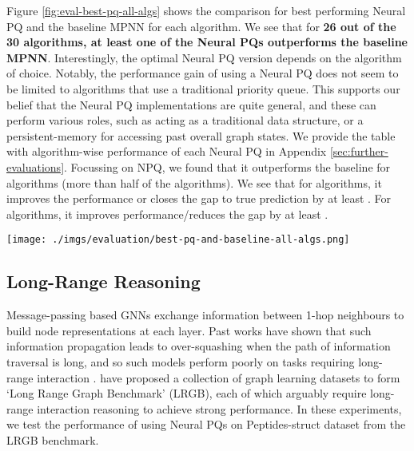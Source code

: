 \documentclass{article}
\theoremstyle{plain}
\theoremstyle{definition}
\theoremstyle{remark}
\begin{document}
Figure \ref{fig:eval-best-pq-all-algs} shows the comparison for best performing Neural PQ and the baseline MPNN for each algorithm.
We see that for \textbf{26 out of the 30 algorithms, at least one of the Neural PQs outperforms the baseline MPNN}. Interestingly, the optimal Neural PQ version depends
on the algorithm of choice. Notably, the performance gain of using a Neural PQ does not seem to be limited to algorithms that use a traditional priority queue.
This supports our belief that the Neural PQ implementations are quite general, and these can perform various roles, such as acting as a traditional data structure,
or a persistent-memory for accessing past overall graph states.
We provide the table with algorithm-wise performance of each Neural PQ in Appendix \ref{sec:further-evaluations}.
Focussing on NPQ, we found that it outperforms the baseline for  algorithms (more than half of the algorithms).
We see that for  algorithms, it improves the performance or closes the gap to true prediction by at least .
For  algorithms, it improves performance/reduces the gap by at least .

\begin{figure*}[tb]
    \centering
    \texttt{[image: ./imgs/evaluation/best-pq-and-baseline-all-algs.png]}
    \caption{Evaluation results for best performing Neural PQ and the baseline MPNN model
             for the 30 algorithms from CLRS-30, sorted by the relative improvement in performance.}
    \label{fig:eval-best-pq-all-algs}
\end{figure*}

\subsection{Long-Range Reasoning}
\label{sec:eval-lrgb}
Message-passing based GNNs exchange information between 1-hop neighbours to build node representations at each layer. Past works have shown that such
information propagation leads to over-squashing when the path of information traversal is long, and so such models perform poorly on tasks requiring long-range
interaction \citep{Alon-GNN-over-squashing,Dwivedi-Long-Range-Benchmark}. \citet{Dwivedi-Long-Range-Benchmark} have proposed a collection of
graph learning datasets to form `Long Range Graph Benchmark' (LRGB), each of which arguably require long-range interaction reasoning to achieve strong performance.
In these experiments, we test the performance of using Neural PQs on Peptides-struct dataset from the LRGB benchmark.
\end{document}
